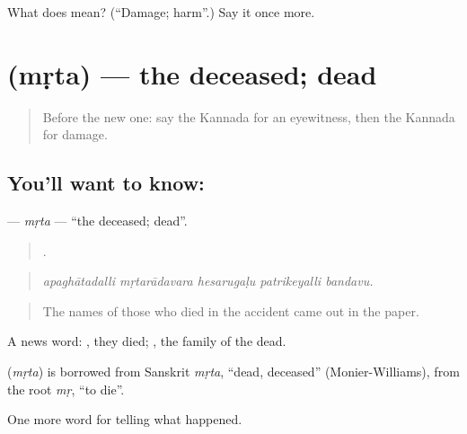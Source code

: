 \begin{tcolorbox}[breakable,colback=teal!4,colframe=teal!35!black,title={Before you move on}]
What does  mean? (\textquotedblleft{}Damage; harm\textquotedblright{}.) Say it once more.
\end{tcolorbox}
\section[\texorpdfstring{\kn{ಮೃತ} (mṛta)}{ಮೃತ (mṛta)}]{ (mṛta) — the deceased; dead}

\label{lesson:KA-C330-mrta}



\begin{quote}
Before the new one: say the Kannada for an eyewitness, then the Kannada for damage.
\end{quote}

\subsection*{You'll want to know: }
\textbf{} — \emph{mṛta} — \textquotedblleft{}the deceased; dead\textquotedblright{}.

\begin{quote}
    .
\end{quote}

\begin{quote}
\emph{apaghātadalli mṛtarādavara hesarugaḷu patrikeyalli bandavu.}
\end{quote}

\begin{quote}
The names of those who died in the accident came out in the paper.
\end{quote}

A news word: , they died;  , the family of the dead.

\begin{cousinweb}
\textbf{} (\emph{mṛta}) is borrowed from Sanskrit \emph{mṛta}, \textquotedblleft{}dead, deceased\textquotedblright{} (Monier-Williams), from the root \emph{mṛ}, \textquotedblleft{}to die\textquotedblright{}.
\end{cousinweb}

\begin{grammarlens}[title={What you've built}]
One more word for telling what happened.
\end{grammarlens}

